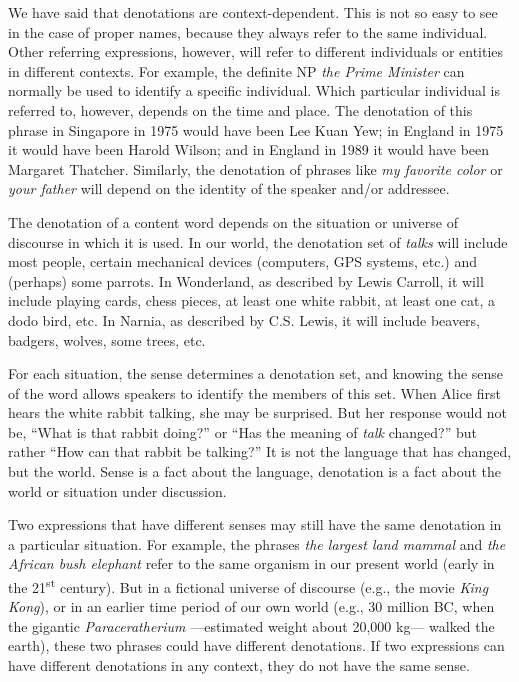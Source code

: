 We have said that denotations are context-dependent. This is not so easy to see in the case of proper names, because they always refer to the same individual. Other referring expressions, however, will refer to different individuals or entities in different contexts. For example, the definite NP \textit{the Prime Minister} can normally be used to identify a specific individual. Which particular individual is referred to, however, depends on the time and place. The denotation of this phrase in Singapore in 1975 would have been Lee Kuan Yew; in England in 1975 it would have been Harold Wilson; and in England in 1989 it would have been Margaret Thatcher. Similarly, the denotation of phrases like \textit{my favorite color} or \textit{your father} will depend on the identity of the speaker and/or addressee.



The denotation of a content word depends on the situation or universe of discourse in which it is used. In our world, the denotation set of \textit{talks} will include most people, certain mechanical devices (computers, GPS systems, etc.) and (perhaps) some parrots. In Wonderland, as described by Lewis Carroll, it will include playing cards, chess pieces, at least one white rabbit, at least one cat, a dodo bird, etc. In Narnia, as described by C.S. Lewis, it will include beavers, badgers, wolves, some trees, etc.



For each situation, the sense determines a denotation set, and knowing the sense of the word allows speakers to identify the members of this set. When Alice first hears the white rabbit talking, she may be surprised. But her response would not be, “What is that rabbit doing?” or “Has the meaning of \textit{talk} changed?” but rather “How can that rabbit be talking?” It is not the language that has changed, but the world. Sense is a fact about the language, denotation is a fact about the world or situation under discussion.



Two expressions that have different senses may still have the same denotation in a particular situation. For example, the phrases \textit{the largest land mammal} and \textit{the African bush elephant} refer to the same organism in our present world (early in the 21\textsuperscript{st} century). But in a fictional universe of discourse (e.g., the movie \textit{King Kong}), or in an earlier time period of our own world (e.g., 30 million BC, when the gigantic \textit{Paraceratherium} —estimated weight about 20,000 kg— walked the earth), these two phrases could have different denotations. If two expressions can have different denotations in any context, they do not have the same sense.



